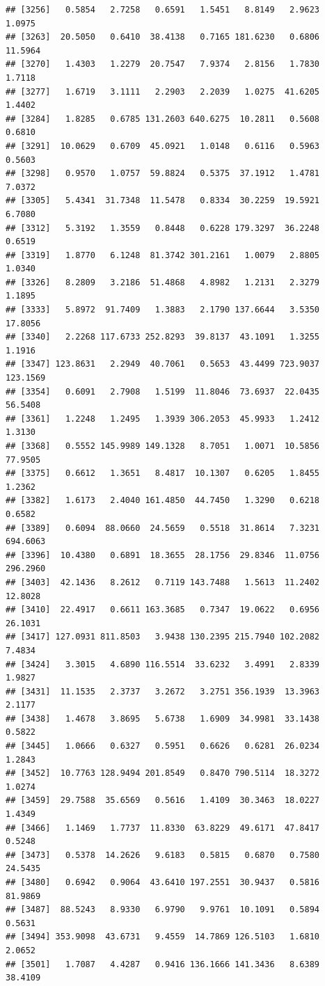 \documentclass{article}\usepackage[]{graphicx}\usepackage[]{color}
\makeatletter
\newenvironment{kframe}{%
 \def\at@end@of@kframe{}%
 \ifinner\ifhmode%
  \def\at@end@of@kframe{\end{minipage}}%
  \begin{minipage}{\columnwidth}%
 \fi\fi%
 \def\FrameCommand##1{\hskip\@totalleftmargin \hskip-\fboxsep
 \colorbox{shadecolor}{##1}\hskip-\fboxsep
     \hskip-\linewidth \hskip-\@totalleftmargin \hskip\columnwidth}%
 \MakeFramed {\advance\hsize-\width
   \@totalleftmargin\z@ \linewidth\hsize
   \@setminipage}}%
 {\par\unskip\endMakeFramed%
 \at@end@of@kframe}
\newenvironment{knitrout}{}{} %
\makeatother
\begin{document}
\begin{knitrout}
\begin{kframe}
\begin{verbatim}
## [3256]   0.5854   2.7258   0.6591   1.5451   8.8149   2.9623   1.0975
## [3263]  20.5050   0.6410  38.4138   0.7165 181.6230   0.6806  11.5964
## [3270]   1.4303   1.2279  20.7547   7.9374   2.8156   1.7830   1.7118
## [3277]   1.6719   3.1111   2.2903   2.2039   1.0275  41.6205   1.4402
## [3284]   1.8285   0.6785 131.2603 640.6275  10.2811   0.5608   0.6810
## [3291]  10.0629   0.6709  45.0921   1.0148   0.6116   0.5963   0.5603
## [3298]   0.9570   1.0757  59.8824   0.5375  37.1912   1.4781   7.0372
## [3305]   5.4341  31.7348  11.5478   0.8334  30.2259  19.5921   6.7080
## [3312]   5.3192   1.3559   0.8448   0.6228 179.3297  36.2248   0.6519
## [3319]   1.8770   6.1248  81.3742 301.2161   1.0079   2.8805   1.0340
## [3326]   8.2809   3.2186  51.4868   4.8982   1.2131   2.3279   1.1895
## [3333]   5.8972  91.7409   1.3883   2.1790 137.6644   3.5350  17.8056
## [3340]   2.2268 117.6733 252.8293  39.8137  43.1091   1.3255   1.1916
## [3347] 123.8631   2.2949  40.7061   0.5653  43.4499 723.9037 123.1569
## [3354]   0.6091   2.7908   1.5199  11.8046  73.6937  22.0435  56.5408
## [3361]   1.2248   1.2495   1.3939 306.2053  45.9933   1.2412   1.3130
## [3368]   0.5552 145.9989 149.1328   8.7051   1.0071  10.5856  77.9505
## [3375]   0.6612   1.3651   8.4817  10.1307   0.6205   1.8455   1.2362
## [3382]   1.6173   2.4040 161.4850  44.7450   1.3290   0.6218   0.6582
## [3389]   0.6094  88.0660  24.5659   0.5518  31.8614   7.3231 694.6063
## [3396]  10.4380   0.6891  18.3655  28.1756  29.8346  11.0756 296.2960
## [3403]  42.1436   8.2612   0.7119 143.7488   1.5613  11.2402  12.8028
## [3410]  22.4917   0.6611 163.3685   0.7347  19.0622   0.6956  26.1031
## [3417] 127.0931 811.8503   3.9438 130.2395 215.7940 102.2082   7.4834
## [3424]   3.3015   4.6890 116.5514  33.6232   3.4991   2.8339   1.9827
## [3431]  11.1535   2.3737   3.2672   3.2751 356.1939  13.3963   2.1177
## [3438]   1.4678   3.8695   5.6738   1.6909  34.9981  33.1438   0.5822
## [3445]   1.0666   0.6327   0.5951   0.6626   0.6281  26.0234   1.2843
## [3452]  10.7763 128.9494 201.8549   0.8470 790.5114  18.3272   1.0274
## [3459]  29.7588  35.6569   0.5616   1.4109  30.3463  18.0227   1.4349
## [3466]   1.1469   1.7737  11.8330  63.8229  49.6171  47.8417   0.5248
## [3473]   0.5378  14.2626   9.6183   0.5815   0.6870   0.7580  24.5435
## [3480]   0.6942   0.9064  43.6410 197.2551  30.9437   0.5816  81.9869
## [3487]  88.5243   8.9330   6.9790   9.9761  10.1091   0.5894   0.5631
## [3494] 353.9098  43.6731   9.4559  14.7869 126.5103   1.6810   2.0652
## [3501]   1.7087   4.4287   0.9416 136.1666 141.3436   8.6389  38.4109

\end{verbatim}
\end{kframe}
\end{knitrout}
\end{document}
